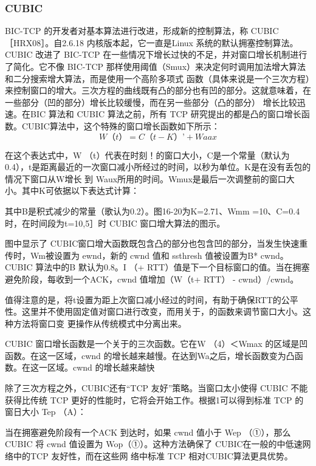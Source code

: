 \subsubsection{CUBIC}
BIC-TCP 的开发者对基本算法进行改进，形成新的控制算法，称 CUBIC ［HRX08］。自2.6.18 内核版本起，它一直是Linux 系统的默认拥塞控制算法。CUBIC 改进了 BIC-TCP
在一些情况下增长过快的不足，并对窗口增长机制进行了简化。它不像 BIC-TCP 那样使用阈值（Smux）来决定何时调用加法增大算法和二分搜索增大算法，而是使用一个高阶多项式
函数（具体来说是一个三次方程）来控制窗口的增大。三次方程的曲线既有凸的部分也有凹的部分。这就意味着，在一些部分（凹的部分）增长比较缓慢，而在另一些部分（凸的部分）
增长比较迅速。在BIC 算法和 CUBIC 算法之前，所有 TCP 研究提出的都是凸的窗口增长函数。CUBIC算法中，这个特殊的窗口增长函数如下所示：
\begin{equation}
    W（t）=C（t-K）’+Waax
\end{equation}

在这个表达式中，W （t）代表在时刻！的窗口大小，C是一个常量（默认为 0.4），t是距离最近的一次窗口减小所经过的时间，以秒为单位。K是在没有丢包的情况下窗口从W增长
到 Waux所用的时间。Wmux是最后一次调整前的窗口大小。其中K可依据以下表达式计算：

其中B是积式减少的常量（歌认为0.2）。图16-20为K=2.71、Wmm =10、C=0.4时，在时间段为t=10,5］时 CUBIC 窗口增大算法的图示。

图中显示了 CUBIC窗口增大函数既包含凸的部分也包含凹的部分，当发生快速重传时，Wm被设置为 ewnd，新的 cwnd 值和 ssthresh 值被设置为B* cwnd。 CUBIC 算法中的B
默认为0.8。I （+ RTT）值是下一个目标窗口的值。当在拥塞避免阶段，每收到一个ACK，cwnd 值增加（W（t+ RTT） - cwnd）/cwnd。

值得注意的是，将t设置为距上次窗口减小经过的时间，有助于确保RTT的公平性。这里并不使用固定值对窗口进行改变，而用关于，的函数来调节窗口大小。这种方法将窗口变
更操作从传统模式中分离出来。

CUBIC 窗口增长函数是一个关于的三次函数。它在W （4）＜Wmax 的区域是凹函数。在这一区域，cwnd 的增长越来越慢。在达到Wa之后，增长函数变为凸函数。在这一区域。cwnd
的增长越来越快

除了三次方程之外，CUBIC还有“TCP 友好”策略。当窗口太小使得 CUBIC 不能获得比传统 TCP 更好的性能时，它将会开始工作。根据1可以得到标准 TCP 的窗日大小 Tep （A）：

当在拥塞避免阶段有一个ACK 到达时，如果 cwnd 值小于 Wep （①），那么 CUBIC 将 cwnd 值设置为 Wop（①）。这种方法确保了 CUBIC在一般的中低速网络中的TCP 友好性，而在这些网
络中标准 TCP 相对CUBIC算法更具优势。

